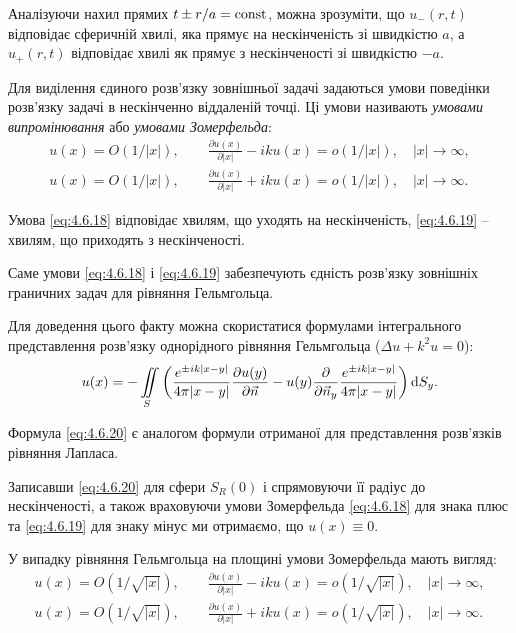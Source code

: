 Аналізуючи нахил прямих $t \pm r / a = \operatorname{const}$, можна зрозуміти, що $u_-(r, t)$ відповідає сферичній хвилі, яка прямує на нескінченість зі швидкістю $a$, а $u_+(r, t)$ відповідає хвилі як прямує з нескінченості зі швидкістю $-a$. \medskip

\begin{definition}
	Для виділення єдиного розв'язку зовнішньої задачі задаються умови поведінки розв'язку задачі в нескінченно віддаленій точці. Ці умови називають \textit{умовами випромінювання} або \textit{умовами Зомерфельда}:
	\begin{gather}
		\label{eq:4.6.18}
		u(x) = O(1/|x|), \qquad \frac{\partial u(x)}{\partial |x|} - i k u(x) = o(1/|x|), \quad |x| \to \infty, \\
		\label{eq:4.6.19}
		u(x) = O(1/|x|), \qquad \frac{\partial u(x)}{\partial |x|} + i k u(x) = o(1/|x|), \quad |x| \to \infty.
	\end{gather}
\end{definition}

Умова \eqref{eq:4.6.18} відповідає хвилям, що уходять на нескінченість, \eqref{eq:4.6.19} – хвилям, що приходять з нескінченості. \medskip

Саме умови \eqref{eq:4.6.18} і \eqref{eq:4.6.19} забезпечують єдність розв'язку зовнішніх граничних задач для рівняння Гельмгольца. \medskip

Для доведення цього факту можна скористатися формулами інтегрального представлення розв'язку однорідного рівняння Гельмгольца ($\Delta u + k^2 u = 0$):
\begin{equation}
	\label{eq:4.6.20}
	u(x) = -\displaystyle\iint\limits_S \left( \frac{e^{\pm i k |x - y|}}{4 \pi |x - y|} \frac{\partial u(y)}{\partial \vec n} - u(y) \frac{\partial}{\partial \vec n_y} \frac{e^{\pm i k |x - y|}}{4 \pi |x - y|} \right) \mathop{}\!\mathrm{d} S_y.
\end{equation}

Формула \eqref{eq:4.6.20} є аналогом формули  отриманої для представлення розв'язків рівняння Лапласа. \medskip

Записавши \eqref{eq:4.6.20} для сфери $S_R(0)$ і спрямовуючи її радіус до нескінченості, а також враховуючи умови Зомерфельда \eqref{eq:4.6.18} для знака плюс та \eqref{eq:4.6.19} для знаку мінус ми отримаємо, що $u(x) \equiv 0$. \medskip

У випадку рівняння Гельмгольца на площині умови Зомерфельда мають вигляд:
\begin{gather}
	\label{eq:4.6.21}
	u(x) = O\left(1/\sqrt{|x|}\right), \qquad \frac{\partial u(x)}{\partial |x|} - i k u(x) = o\left(1/\sqrt{|x|}\right), \quad |x| \to \infty, \\
	\label{eq:4.6.22}
	u(x) = O\left(1/\sqrt{|x|}\right), \qquad \frac{\partial u(x)}{\partial |x|} + i k u(x) = o\left(1/\sqrt{|x|}\right), \quad |x| \to \infty.
\end{gather}

